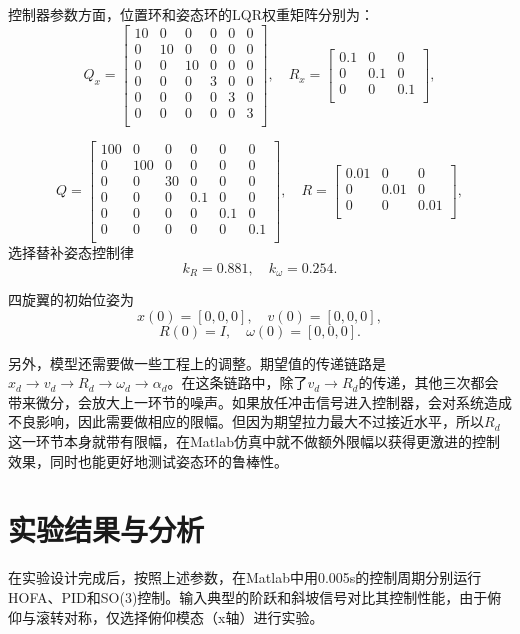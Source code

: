 控制器参数方面，位置环和姿态环的LQR权重矩阵分别为：
$$Q_x=\begin{bmatrix}
  10&0&0&0&0&0\\
  0&10&0&0&0&0\\
  0&0&10&0&0&0\\
  0&0&0&3&0&0\\
  0&0&0&0&3&0\\
  0&0&0&0&0&3\\
\end{bmatrix}, \quad R_x=\begin{bmatrix}
  0.1 &0 &0\\
  0 &0.1 &0\\
  0 &0 &0.1\\
\end{bmatrix},$$

$$Q=\begin{bmatrix}
  100&0&0&0&0&0\\
  0&100&0&0&0&0\\
  0&0&30&0&0&0\\
  0&0&0&0.1&0&0\\
  0&0&0&0&0.1&0\\
  0&0&0&0&0&0.1\\
\end{bmatrix}, \quad R=\begin{bmatrix}
  0.01 &0 &0\\
  0 &0.01 &0\\
  0 &0 &0.01\\
\end{bmatrix},$$
选择替补姿态控制律
$$k_R=0.881 ,\quad k_\omega=0.254.$$

四旋翼的初始位姿为
$$x(0)=[0,0,0],\quad v(0)=[0,0,0],$$
$$R(0)=I , \quad \omega(0)=[0,0,0].$$

另外，模型还需要做一些工程上的调整。期望值的传递链路是$x_d \to v_d \to R_d \to \omega_d \to \alpha_d$。在这条链路中，除了$ v_d \to R_d$的传递，其他三次都会带来微分，会放大上一环节的噪声。如果放任冲击信号进入控制器，会对系统造成不良影响，因此需要做相应的限幅。但因为期望拉力最大不过接近水平，所以$R_d$这一环节本身就带有限幅，在Matlab仿真中就不做额外限幅以获得更激进的控制效果，同时也能更好地测试姿态环的鲁棒性。

\section{实验结果与分析}

  在实验设计完成后，按照上述参数，在Matlab中用0.005s的控制周期分别运行HOFA、PID和SO(3)控制。输入典型的阶跃和斜坡信号对比其控制性能，由于俯仰与滚转对称，仅选择俯仰模态（x轴）进行实验。

